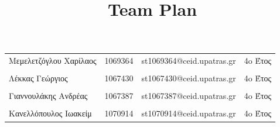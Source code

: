\documentclass{../ol-softwaremanual}
\begin{document}
	
	
	\begin{titlepage}
		
		
		\title{\en Team Plan \\}
		
	\end{titlepage}
	
	
	\maketitle
	
	\newpage
	
	
	\vspace{20pt}
	
	
	
	\begin{table}[htbp!]
		
		\begin{tabular}{llll}
			Μεμελετζόγλου Χαρίλαος & 1069364 & \en st1069364@ceid.upatras.gr & 4o Έτος   \\ 
			\\ Λέκκας Γεώργιος      &      1067430    &   \en st1067430@ceid.upatras.gr & 4o Έτος  \\
			\\ Γιαννουλάκης Ανδρέας        &   1067387       & \en st1067387@ceid.upatras.gr & 4o Έτος           \\
			\\ Κανελλόπουλος Ιωακείμ        &  1070914        &    \en st1070914@ceid.upatras.gr & 4o Έτος        \\ 
		\end{tabular}
	\end{table}
	
\end{document}
